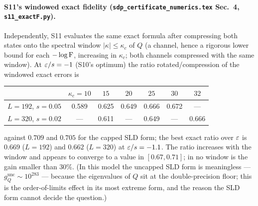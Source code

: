 \documentclass[11pt,a4paper]{article}
\begin{document}
\paragraph{S11's windowed exact fidelity (\texttt{sdp\_certificate\_numerics.tex} Sec.~4, \texttt{s11\_exactF.py}).}
Independently, S11 evaluates the same exact formula after compressing both states onto the spectral
window \(|\kappa|\le\kappa_c\) of \(Q\) (a channel, hence a rigorous lower bound for each
\(-\log\operatorname{F}\), increasing in \(\kappa_c\); both channels compressed with the same window).  At
\(\varepsilon/s=-1\) (S10's optimum) the ratio rotated/compression of the windowed exact errors is
\begin{center}\small
\begin{tabular}{lcccccc}
\toprule
 & \(\kappa_c=10\) & \(15\) & \(20\) & \(25\) & \(30\) & \(32\)\\
\midrule
\(L=192\), \(s=0.05\) & 0.589 & 0.625 & 0.649 & 0.666 & 0.672 & ---\\
\(L=320\), \(s=0.02\) & --- & 0.611 & --- & 0.649 & --- & 0.666\\
\bottomrule
\end{tabular}
\end{center}
against \(0.709\) and \(0.705\) for the capped SLD form; the best exact ratio over \(\varepsilon\) is
\(0.669\) (\(L=192\)) and \(0.662\) (\(L=320\)) at \(\varepsilon/s=-1.1\).  The ratio increases with the
window and appears to converge to a value in \([0.67,0.71]\); in no window is the gain smaller
than \(30\%\).  (In this model the uncapped SLD form is meaningless --- \(g_Q^{\mathrm{unc}}\sim10^{283}\)
--- because the eigenvalues of \(Q\) sit at the double-precision floor; this is the order-of-limits
effect in its most extreme form, and the reason the SLD form cannot decide the question.)
\end{document}
